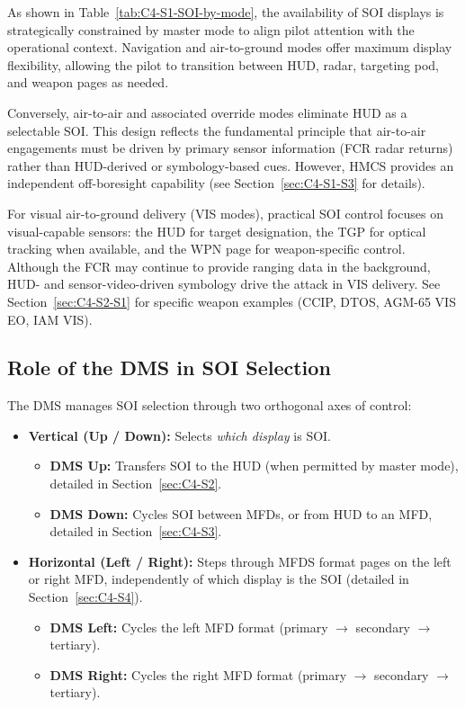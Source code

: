 \documentclass[11pt, a4paper, twoside]{report}
\begin{document}
As shown in Table~\ref{tab:C4-S1-SOI-by-mode}, the availability of SOI displays is strategically constrained by master mode to align pilot attention with the operational context. Navigation and air-to-ground modes offer maximum display flexibility, allowing the pilot to transition between HUD, radar, targeting pod, and weapon pages as needed.

Conversely, air-to-air and associated override modes eliminate HUD as a selectable SOI. This design reflects the fundamental principle that air-to-air engagements must be driven by primary sensor information (FCR radar returns) rather than HUD-derived or symbology-based cues. However, HMCS provides an independent off-boresight capability (see Section~\ref{sec:C4-S1-S3} for details).

For visual air-to-ground delivery (VIS modes), practical SOI control focuses on visual-capable sensors: the HUD for target designation, the TGP for optical tracking when available, and the WPN page for weapon-specific control. Although the FCR may continue to provide ranging data in the background, HUD- and sensor-video-driven symbology drive the attack in VIS delivery. See Section~\ref{sec:C4-S2-S1} for specific weapon examples (CCIP, DTOS, AGM-65 VIS EO, IAM VIS).

\subsection{Role of the DMS in SOI Selection}
\label{sec:C4-S1-S2}

The DMS manages SOI selection through two orthogonal axes of control:

\begin{itemize}
    \item \textbf{Vertical (Up / Down):} Selects \textit{which display} is SOI.
        \begin{itemize}
            \item \textbf{DMS Up:} Transfers SOI to the HUD (when permitted by master mode), detailed in Section~\ref{sec:C4-S2}.
            \item \textbf{DMS Down:} Cycles SOI between MFDs, or from HUD to an MFD, detailed in Section~\ref{sec:C4-S3}.
        \end{itemize}
    \item \textbf{Horizontal (Left / Right):} Steps through MFDS format pages on the left or right MFD, independently of which display is the SOI (detailed in Section~\ref{sec:C4-S4}).
        \begin{itemize}
            \item \textbf{DMS Left:} Cycles the left MFD format (primary $\to$ secondary $\to$ tertiary).
            \item \textbf{DMS Right:} Cycles the right MFD format (primary $\to$ secondary $\to$ tertiary).
        \end{itemize}
\end{itemize}
\end{document}
